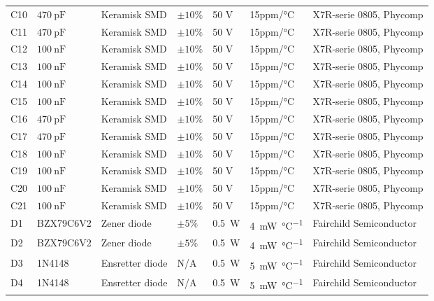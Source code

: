 \begin{table}[h!]
\begin{threeparttable}
\begin{tabular}{ l l l l l l l }
C10 & $\SI{470}{\pico\farad}$ & Keramisk SMD & $\pm 10\%$ & 50 \si{\volt} & 15ppm/\si{\celsius} & X7R-serie 0805, Phycomp \\
C11 & $\SI{470}{\pico\farad}$ & Keramisk SMD & $\pm 10\%$ & 50 \si{\volt} & 15ppm/\si{\celsius} & X7R-serie 0805, Phycomp \\
C12 & $\SI{100}{\nano\farad}$ & Keramisk SMD & $\pm 10\%$ & 50 \si{\volt} & 15ppm/\si{\celsius} & X7R-serie 0805, Phycomp \\
C13 & $\SI{100}{\nano\farad}$ & Keramisk SMD & $\pm 10\%$ & 50 \si{\volt} & 15ppm/\si{\celsius} & X7R-serie 0805, Phycomp \\
C14 & $\SI{100}{\nano\farad}$ & Keramisk SMD & $\pm 10\%$ & 50 \si{\volt} & 15ppm/\si{\celsius} & X7R-serie 0805, Phycomp \\
C15 & $\SI{100}{\nano\farad}$ & Keramisk SMD & $\pm 10\%$ & 50 \si{\volt} & 15ppm/\si{\celsius} & X7R-serie 0805, Phycomp \\
C16 & $\SI{470}{\pico\farad}$ & Keramisk SMD & $\pm 10\%$ & 50 \si{\volt} & 15ppm/\si{\celsius} & X7R-serie 0805, Phycomp \\
C17 & $\SI{470}{\pico\farad}$ & Keramisk SMD & $\pm 10\%$ & 50 \si{\volt} & 15ppm/\si{\celsius} & X7R-serie 0805, Phycomp \\
C18 & $\SI{100}{\nano\farad}$ & Keramisk SMD & $\pm 10\%$ & 50 \si{\volt} & 15ppm/\si{\celsius} & X7R-serie 0805, Phycomp \\
C19 & $\SI{100}{\nano\farad}$ & Keramisk SMD & $\pm 10\%$ & 50 \si{\volt} & 15ppm/\si{\celsius} & X7R-serie 0805, Phycomp \\
C20 & $\SI{100}{\nano\farad}$ & Keramisk SMD & $\pm 10\%$ & 50 \si{\volt} & 15ppm/\si{\celsius} & X7R-serie 0805, Phycomp \\
C21 & $\SI{100}{\nano\farad}$ & Keramisk SMD & $\pm 10\%$ & 50 \si{\volt} & 15ppm/\si{\celsius} & X7R-serie 0805, Phycomp \\
D1 & BZX79C6V2 & Zener diode & $\pm 5 \%$ & \SI{0.5}{\watt} & \SI{4}{\milli\watt\per\celsius} & Fairchild Semiconductor \\
D2 & BZX79C6V2 & Zener diode & $\pm 5 \%$ & \SI{0.5}{\watt} & \SI{4}{\milli\watt\per\celsius} & Fairchild Semiconductor \\
D3 & 1N4148 & Ensretter diode & N/A & \SI{0.5}{\watt} & \SI{5}{\milli\watt\per\celsius} & Fairchild Semiconductor \\
D4 & 1N4148 & Ensretter diode & N/A & \SI{0.5}{\watt} & \SI{5}{\milli\watt\per\celsius} & Fairchild Semiconductor \\

\end{tabular}
\end{threeparttable}
\end{table}
